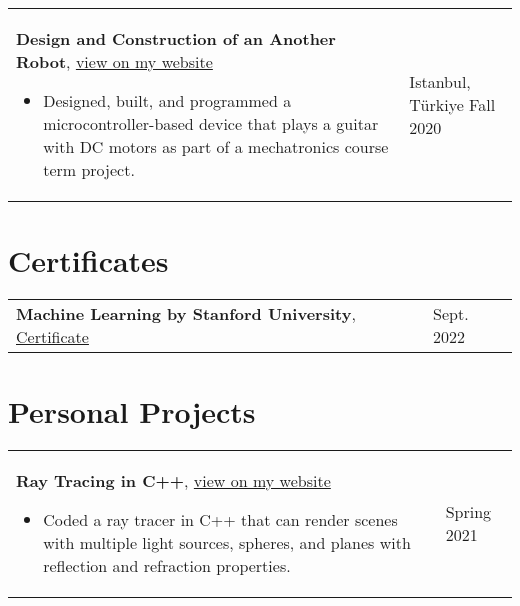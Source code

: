 \documentclass[10pt, a4paper]{article}
\newenvironment{highlights}{
        \begin{itemize}[
                topsep=0pt,
                parsep=0.07 cm,
                partopsep=0pt,
                itemsep=0pt,
                after=\vspace{-1\baselineskip},
                leftmargin=0.6 cm + 3pt
            ]
    }{
        \end{itemize}
    } %
\let\hrefWithoutArrow\href
\renewcommand{\href}[2]{\hrefWithoutArrow{#1}{#2 \raisebox{.15ex}{\footnotesize \faExternalLink*}}}
\begin{document}
        \vspace{0.12 cm}
        \begin{tabularx}{ cm-0.13cm}{K{0.2 cm} R{3.6 cm}}
            \textbf{Design and Construction of an Another Robot}, \href{https://example.com/}{view on my website}
            \vspace{0.12 cm}
            \begin{highlights}
                \item Designed, built, and programmed a microcontroller-based device that plays a guitar with DC motors as part of a mechatronics course term project. \hspace*{-0.2cm}
            \end{highlights}
        &
            Istanbul, Türkiye \newline
            Fall 2020
        \end{tabularx}



    \section{Certificates}
    
        \begin{tabularx}{ cm-0.13cm}{K{0.2 cm} R{3.6 cm}}
            \textbf{Machine Learning by Stanford University}, \href{https://example.com/}{Certificate}
            \vspace{0.12 cm}
        &
            Sept. 2022
        \end{tabularx}



    \section{Personal Projects}
    
        \begin{tabularx}{ cm-0.13cm}{K{0.2 cm} R{3.6 cm}}
            \textbf{Ray Tracing in C++}, \href{https://example.com/}{view on my website}
            \vspace{0.12 cm}
            \begin{highlights}
                \item Coded a ray tracer in C++ that can render scenes with multiple light sources, spheres, and planes with reflection and refraction properties. \hspace*{-0.2cm}
            \end{highlights}
        &
            Spring 2021
        \end{tabularx}
\end{document}
